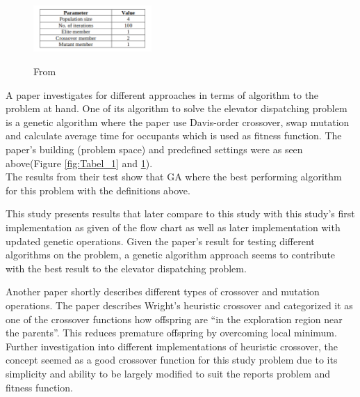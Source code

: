 \begin{figure}[ht]
\centering
\includegraphics[width=0.4\textwidth]{samuel.png}
	\label{fig:Tabel_2}
	\caption{From \cite{ahmed2022investigation}}
\end{figure}

A paper\cite{ahmed2022investigation} investigates for different approaches in terms of algorithm to the problem at hand. One of its algorithm to solve the elevator dispatching problem is a genetic algorithm where the paper use Davis-order crossover, swap mutation and calculate average time for occupants  which is used as fitness function. The paper's building (problem space) and predefined settings were as seen above(Figure \ref{fig:Tabel_1} and \ref{fig:Tabel_2}).
\\
The results from their test show that GA where the best performing algorithm for this problem with the definitions above.

This study presents results that later compare to this study with this study's first implementation as given of the flow chart \cite{tartan2016genetic} as well as later implementation with updated genetic operations. Given the paper's result for testing different algorithms on the problem, a genetic algorithm approach seems to contribute with the best result to the elevator dispatching problem.

Another paper\cite{lim2017crossover} shortly describes different types of crossover and mutation operations. The paper describes Wright's heuristic crossover and categorized it as one of the crossover functions how offspring are “in the exploration region near the parents”\cite{lim2017crossover}. This reduces premature offspring by overcoming local minimum. Further investigation into different implementations of heuristic crossover, the concept seemed as a good crossover function for this study problem due to its simplicity and ability to be largely modified to suit the reports problem and fitness function.


